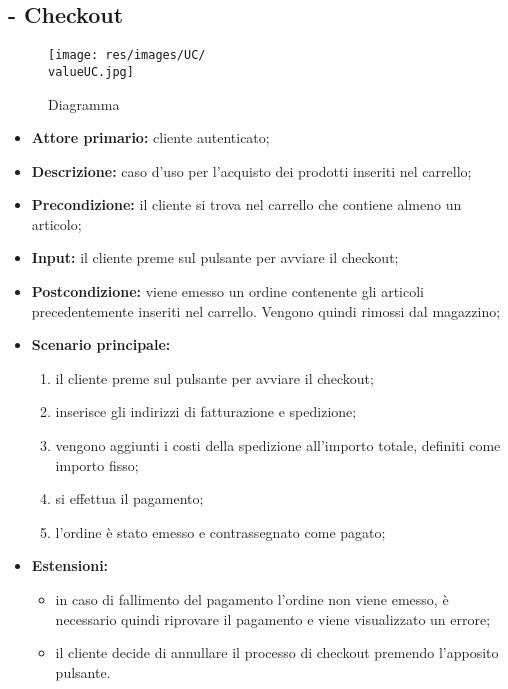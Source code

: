\subsection{ - Checkout}
\begin{figure}[H]
    \centering
    \texttt{[image: res/images/UC/\\valueUC.jpg]}
    \caption{Diagramma }
\end{figure}
\begin{itemize}
    \item \textbf{Attore primario:} cliente autenticato;
    \item \textbf{Descrizione:} caso d'uso per l'acquisto dei prodotti inseriti nel carrello;
    \item \textbf{Precondizione:} il cliente si trova nel carrello che contiene almeno un articolo;
    \item \textbf{Input:} il cliente preme sul pulsante per avviare il checkout;
    \item \textbf{Postcondizione:} viene emesso un ordine contenente gli articoli precedentemente inseriti nel carrello. Vengono quindi rimossi dal magazzino;
    \item \textbf{Scenario principale:}
          \begin{enumerate}
              \item il cliente preme sul pulsante per avviare il checkout;
              \item inserisce gli indirizzi di fatturazione e spedizione;
              \item vengono aggiunti i costi della spedizione all'importo totale, definiti come importo fisso;
              \item si effettua il pagamento;
              \item l'ordine è stato emesso e contrassegnato come pagato;
          \end{enumerate}
    \item \textbf{Estensioni:}
          \begin{itemize}
              \item in caso di fallimento del pagamento l'ordine non viene emesso, è necessario quindi riprovare il pagamento e viene visualizzato un errore;
              \item il cliente decide di annullare il processo di checkout premendo l'apposito pulsante.
          \end{itemize}
\end{itemize}

